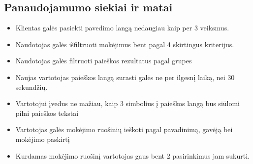 \documentclass{VUMIFPSkursinis}
\begin{document}
\subsection{Panaudojamumo siekiai ir matai}
\begin{itemize}
	\item Klientas galės pasiekti pavedimo langą nedaugiau kaip per 3 veiksmus.
	\item Naudotojas galės išfiltruoti mokėjimus bent pagal 4 skirtingus kriterijus.
	\item Naudotojas galės filtruoti paieškos rezultatus pagal grupes
	\item Naujas vartotojas paieškos langą surasti galės ne per ilgesnį laiką, nei 30 sekundžių.
	\item Vartotojui įvedus ne mažiau, kaip 3 simbolius į paieškos langą bus siūlomi pilni paieškos tekstai
	\item Vartotojas galės mokėjimo ruošinių ieškoti pagal pavadinimą, gavėją bei mokėjimo paskirtį
	\item Kurdamas mokėjimo ruošinį vartotojas gaus bent 2 pasirinkimus jam sukurti.
\end{itemize}
\pagebreak
\end{document}
